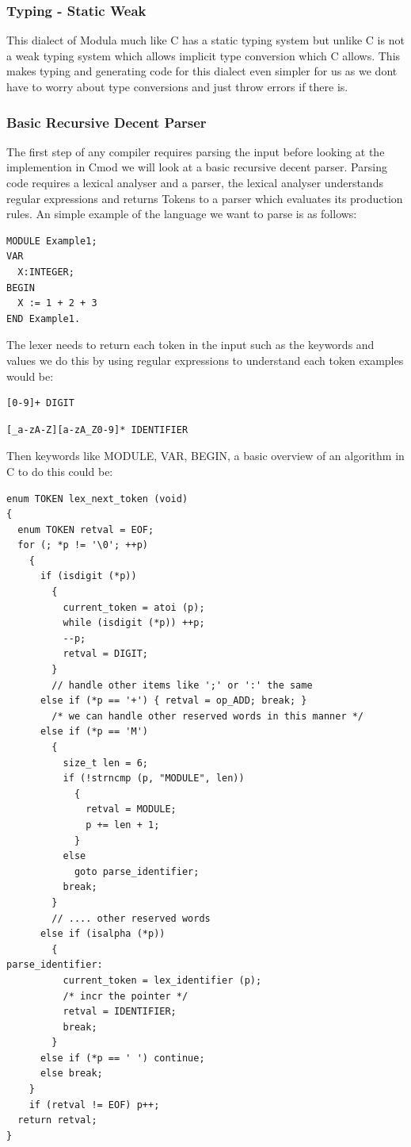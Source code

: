 \documentclass[defaultstyle,11pt]{article}
\begin{document}
\subsubsection{Typing - Static Weak}
This dialect of Modula much like C has a static typing system but unlike C is not a weak typing system which allows implicit
type conversion which C allows. This makes typing and generating code for this dialect even simpler for us as we dont have to
worry about type conversions and just throw errors if there is.

\subsubsection{Basic Recursive Decent Parser}
The first step of any compiler requires parsing the input before looking at the implemention in Cmod we will look at a basic recursive
decent parser. Parsing code requires a lexical analyser and a parser, the lexical analyser understands regular expressions and returns Tokens
to a parser which evaluates its production rules. An simple example of the language we want to parse is as follows:

\begin{lstlisting}
MODULE Example1;
VAR
  X:INTEGER;
BEGIN
  X := 1 + 2 + 3
END Example1.
\end{lstlisting}

The lexer needs to return each token in the input such as the keywords and values we do this by using regular expressions to understand
each token examples would be:

\begin{verbatim}
[0-9]+ DIGIT
\end{verbatim} 
\begin{verbatim}
[_a-zA-Z][a-zA_Z0-9]* IDENTIFIER
\end{verbatim}

Then keywords like MODULE, VAR, BEGIN, a basic overview of an algorithm in C to do this could be:

\begin{lstlisting}
enum TOKEN lex_next_token (void)
{
  enum TOKEN retval = EOF;
  for (; *p != '\0'; ++p)
    {
      if (isdigit (*p))
        {
          current_token = atoi (p);
          while (isdigit (*p)) ++p;
          --p;
          retval = DIGIT;
        }
        // handle other items like ';' or ':' the same
      else if (*p == '+') { retval = op_ADD; break; }
        /* we can handle other reserved words in this manner */
      else if (*p == 'M')
        {
          size_t len = 6;
          if (!strncmp (p, "MODULE", len))
            {
              retval = MODULE;
              p += len + 1;
            }
          else
            goto parse_identifier;
          break;
        }
        // .... other reserved words
      else if (isalpha (*p))
        {
parse_identifier:
          current_token = lex_identifier (p);
          /* incr the pointer */
          retval = IDENTIFIER;
          break;
        }
      else if (*p == ' ') continue;
      else break;
    }
    if (retval != EOF) p++;
  return retval;
}
\end{lstlisting}
\end{document}
